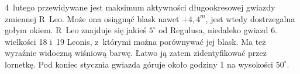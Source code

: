 {\begin{dwieszpalty}
4~lutego przewidywane jest maksimum aktywności długookresowej gwiazdy zmiennej R~Leo. Może ona osiągnąć blask nawet $+4,4^m$, jest wtedy dostrzegalna gołym okiem. R~Leo znajduje się jakieś $5^{\circ}$ od Regulusa, niedaleko gwiazd 6. wielkości 18 i~19 Leonis, z~którymi można porównywać jej blask. Ma też wyraźnie widoczną wiśniową barwę. Łatwo ją zatem zidentyfikować przez lornetkę. Pod koniec stycznia gwiazda góruje około godziny 1 na wysokości $50^{\circ}$.

{}
\end{dwieszpalty}

}\eject
\normalsize